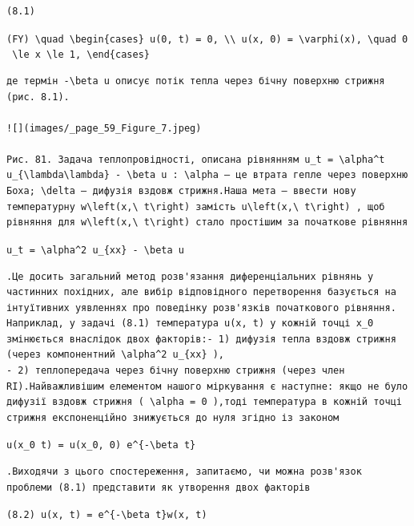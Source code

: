 \documentclass[
  ukrainian,
]{article}
\begin{document}
\begin{verbatim}
(8.1)
\end{verbatim}

\texttt{(FY)\ \textbackslash{}quad\ \textbackslash{}begin\{cases\}\ u(0,\ t)\ =\ 0,\ \textbackslash{}\textbackslash{}\ u(x,\ 0)\ =\ \textbackslash{}varphi(x),\ \textbackslash{}quad\ 0\ \textbackslash{}le\ x\ \textbackslash{}le\ 1,\ \textbackslash{}end\{cases\}}

\begin{verbatim}
де термін -\beta u описує потік тепла через бічну поверхню стрижня (рис. 8.1).

![](images/_page_59_Figure_7.jpeg)

Рис. 81. Задача теплопровідності, описана рівнянням u_t = \alpha^t u_{\lambda\lambda} - \beta u : \alpha — це втрата гепле через поверхню Боха; \delta – дифузія вздовж стрижня.Наша мета — ввести нову температурну w\left(x,\ t\right) замість u\left(x,\ t\right) , щоб рівняння для w\left(x,\ t\right) стало простішим за початкове рівняння
\end{verbatim}

\texttt{u\_t\ =\ \textbackslash{}alpha\^{}2\ u\_\{xx\}\ -\ \textbackslash{}beta\ u}

\begin{verbatim}
.Це досить загальний метод розв'язання диференціальних рівнянь у частинних похідних, але вибір відповідного перетворення базується на інтуїтивних уявленнях про поведінку розв'язків початкового рівняння. Наприклад, у задачі (8.1) температура u(x, t) у кожній точці x_0 змінюється внаслідок двох факторів:- 1) дифузія тепла вздовж стрижня (через компонентний \alpha^2 u_{xx} ),
- 2) теплопередача через бічну поверхню стрижня (через член RI).Найважливішим елементом нашого міркування є наступне: якщо не було дифузії вздовж стрижня ( \alpha = 0 ),тоді температура в кожній точці стрижня експоненційно знижується до нуля згідно із законом
\end{verbatim}

\texttt{u(x\_0\ t)\ =\ u(x\_0,\ 0)\ e\^{}\{-\textbackslash{}beta\ t\}}

\begin{verbatim}
.Виходячи з цього спостереження, запитаємо, чи можна розв'язок проблеми (8.1) представити як утворення двох факторів
\end{verbatim}

\texttt{(8.2)\ u(x,\ t)\ =\ e\^{}\{-\textbackslash{}beta\ t\}w(x,\ t)}
\end{document}
